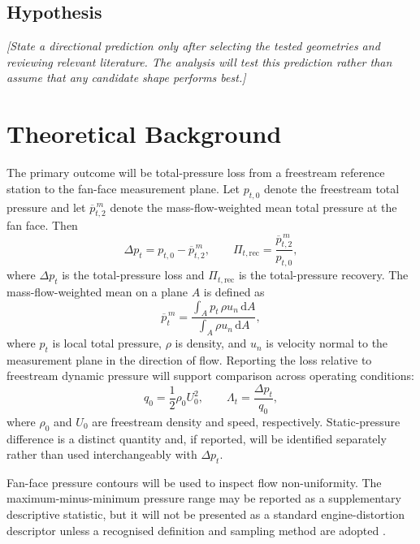 \documentclass[11pt]{article}
\begin{document}
\subsection{Hypothesis}
\emph{[State a directional prediction only after selecting the tested geometries and reviewing relevant literature. The analysis will test this prediction rather than assume that any candidate shape performs best.]}

\section{Theoretical Background}
The primary outcome will be total-pressure loss from a freestream reference station to the fan-face measurement plane. Let $p_{t,0}$ denote the freestream total pressure and let $\overline{p}_{t,2}^{\,m}$ denote the mass-flow-weighted mean total pressure at the fan face. Then
\begin{equation}
    \Delta p_t = p_{t,0} - \overline{p}_{t,2}^{\,m},
    \qquad
    \Pi_{t,\mathrm{rec}} = \frac{\overline{p}_{t,2}^{\,m}}{p_{t,0}},
    \label{eq:pressure-recovery}
\end{equation}
where $\Delta p_t$ is the total-pressure loss and $\Pi_{t,\mathrm{rec}}$ is the total-pressure recovery. The mass-flow-weighted mean on a plane $A$ is defined as
\begin{equation}
    \overline{p}_{t}^{\,m} =
    \frac{\displaystyle\int_A p_t\,\rho u_n\,\mathrm{d}A}
         {\displaystyle\int_A \rho u_n\,\mathrm{d}A},
    \label{eq:mass-weighted-pressure}
\end{equation}
where $p_t$ is local total pressure, $\rho$ is density, and $u_n$ is velocity normal to the measurement plane in the direction of flow. Reporting the loss relative to freestream dynamic pressure will support comparison across operating conditions:
\begin{equation}
    q_0 = \frac{1}{2}\rho_0 U_0^2,
    \qquad
    \Lambda_t = \frac{\Delta p_t}{q_0},
    \label{eq:normalised-loss}
\end{equation}
where $\rho_0$ and $U_0$ are freestream density and speed, respectively. Static-pressure difference is a distinct quantity and, if reported, will be identified separately rather than used interchangeably with $\Delta p_t$.

Fan-face pressure contours will be used to inspect flow non-uniformity. The maximum-minus-minimum pressure range may be reported as a supplementary descriptive statistic, but it will not be presented as a standard engine-distortion descriptor unless a recognised definition and sampling method are adopted \cite{slater2025,ybarra1981}.
\end{document}

